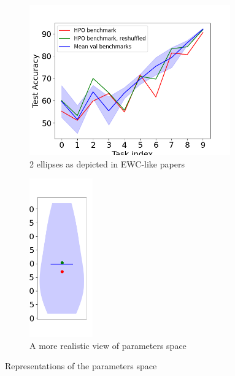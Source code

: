 \documentclass[11pt]{article}
\begin{document}
\begin{figure}
    \centering
    \begin{subfigure}[b]{0.35\textwidth}
        \centering
        \includegraphics[width=0.95\textwidth]{images/accuracy_through_benchmarks_greedy_HPO_GroHess_from_output_pMNIST_via_torch_standard_2024-07-16_20-54-00.png}
        \caption{2 ellipses as depicted in EWC-like papers}
        \label{fig:val_accs_matrix}
    \end{subfigure}
    \hspace{-0mm}
    \begin{subfigure}[b]{0.35\textwidth}
        \centering
        \includegraphics[width=0.3\textwidth]{images/violin_greedy_HPO_GroHess_from_output_pMNIST_via_torch_standard_2024-07-16_20-54-01.png}
        \caption{A more realistic view of parameters space}
        \label{fig:graph_test_vs_val}
    \end{subfigure}
    \caption{Representations of the parameters space}
\end{figure}
\end{document}
